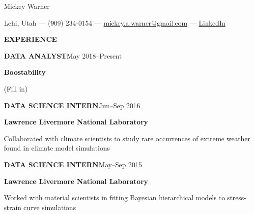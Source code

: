 \documentclass[12pt]{article}
\newcommand{\entrypar}[5]{
    \textbf{\MakeUppercase{#1}}\hfill #3--#4

    \textbf{#2}

    #5
    }
\begin{document}
\begin{center}
\begin{Huge}
Mickey Warner
\end{Huge}
\smallskip
\smallskip

Lehi, Utah --- (909) 234-0154 --- \href{mailto:mickey.a.warner@gmail.com}{mickey.a.warner@gmail.com} --- \href{https://www.linkedin.com/in/mickey-warner/}{LinkedIn}
\end{center}

\hline

\bigskip

\begin{minipage}[t]{0.19\textwidth}
    \begin{flushright}
        \textbf{EXPERIENCE} \vert\ 
    \end{flushright}
\end{minipage}%
%
\begin{minipage}[t]{0.81\textwidth}
    \begin{flushleft}
        \entrypar{Data analyst}{Boostability}{May 2018}{Present}{(Fill in)}
        \bigskip

        \entrypar{Data science intern}{Lawrence Livermore National Laboratory}{Jun}{Sep 2016}{Collaborated with climate scientists to study rare occurrences of extreme weather found in climate model simulations}
        \bigskip

        \entrypar{Data science intern}{Lawrence Livermore National Laboratory}{May}{Sep 2015}{Worked with material scientists in fitting Bayesian hierarchical models to stress-strain curve simulations}
    \end{flushleft}
\end{minipage}

\bigskip
\bigskip
\end{document}
